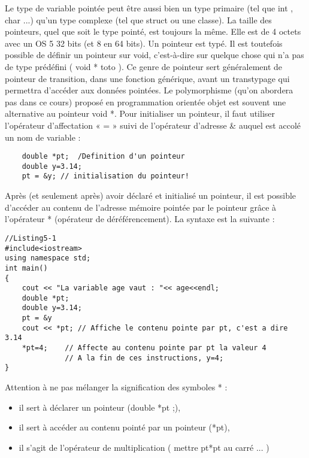 \documentclass[a4paper, oneside,11pt]{book}
\begin{document}
Le type de variable point\'ee peut \^etre aussi bien un type primaire (tel que int , char ...) qu'un type
complexe (tel que struct ou une classe). La taille des pointeurs, quel que soit le type point\'e,
est toujours la m\^eme. Elle est de 4 octets avec un OS 5 32 bits (et 8 en 64 bits). Un pointeur est
typ\'e. Il est toutefois possible de d\'efinir un pointeur sur void, c'est-\`a-dire sur quelque chose qui
n'a pas de type pr\'ed\'efini ( void * toto ). Ce genre de pointeur sert g\'en\'eralement de pointeur de
transition, dans une fonction g\'en\'erique, avant un transtypage qui permettra d'acc\'eder aux donn\'ees
point\'ees. Le polymorphisme (qu'on abordera pas dans ce cours) propos\'e en programmation orient\'ee objet est souvent une
alternative au pointeur void *.
Pour initialiser un pointeur, il faut utiliser l'op\'erateur d'affectation « = » suivi de l'op\'erateur
d'adresse \& auquel est accol\'e un nom de variable :

\begin{verbatim}
    double *pt;  /Definition d'un pointeur
    double y=3.14;
    pt = &y; // initialisation du pointeur!
\end{verbatim} 

Apr\`es (et seulement apr\`es) avoir d\'eclar\'e et initialis\'e un pointeur, il est possible d'acc\'eder au
contenu de l'adresse m\'emoire point\'ee par le pointeur gr\^ace \`a l'op\'erateur * (op\'erateur de d\'er\'ef\'erencement). La syntaxe est la
suivante :


\begin{lstlisting}
//Listing5-1
#include<iostream>
using namespace std;
int main()
{
    cout << "La variable age vaut : "<< age<<endl;
    double *pt;
    double y=3.14;
    pt = &y
    cout << *pt; // Affiche le contenu pointe par pt, c'est a dire 3.14
    *pt=4;    // Affecte au contenu pointe par pt la valeur 4
              // A la fin de ces instructions, y=4;
}
\end{lstlisting}

Attention \`a ne pas m\'elanger la signification des symboles * :

\begin{itemize}
\item il sert \`a d\'eclarer un pointeur (double *pt ;),
\item  il sert \`a acc\'eder au contenu point\'e par un pointeur (*pt),
\item il s'agit de l'op\'erateur de multiplication ( mettre pt*pt au carr\'e ... )
\end{itemize}
\end{document}

